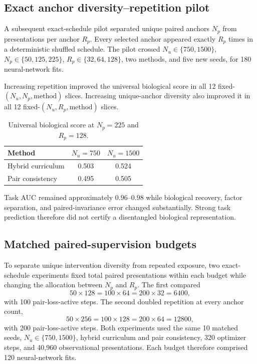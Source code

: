 \subsection{Exact anchor diversity--repetition pilot}
A subsequent exact-schedule pilot separated unique paired anchors $N_p$ from presentations per anchor $R_p$. Every selected anchor appeared exactly $R_p$ times in a deterministic shuffled schedule. The pilot crossed $N_u\in\{750,1500\}$, $N_p\in\{50,125,225\}$, $R_p\in\{32,64,128\}$, two methods, and five new seeds, for 180 neural-network fits.

Increasing repetition improved the universal biological score in all 12 fixed-$(N_u,N_p,\text{method})$ slices. Increasing unique-anchor diversity also improved it in all 12 fixed-$(N_u,R_p,\text{method})$ slices.

\begin{table}[t]
\centering
\caption{Universal biological score at $N_p=225$ and $R_p=128$.}
\small
\begin{tabular}{lcc}
\toprule
Method & $N_u=750$ & $N_u=1500$\\
\midrule
Hybrid curriculum & 0.503 & 0.524\\
Pair consistency & 0.495 & 0.505\\
\bottomrule
\end{tabular}
\end{table}

Task AUC remained approximately $0.96$--$0.98$ while biological recovery, factor separation, and paired-invariance error changed substantially. Strong task prediction therefore did not certify a disentangled biological representation.

\subsection{Matched paired-supervision budgets}
To separate unique intervention diversity from repeated exposure, two exact-schedule experiments fixed total paired presentations within each budget while changing the allocation between $N_p$ and $R_p$. The first compared
\begin{equation}
50\times128=100\times64=200\times32=6400,
\end{equation}
with 100 pair-loss-active steps. The second doubled repetition at every anchor count,
\begin{equation}
50\times256=100\times128=200\times64=12800,
\end{equation}
with 200 pair-loss-active steps. Both experiments used the same 10 matched seeds, $N_u\in\{750,1500\}$, hybrid curriculum and pair consistency, 320 optimizer steps, and 40,960 observational presentations. Each budget therefore comprised 120 neural-network fits.

